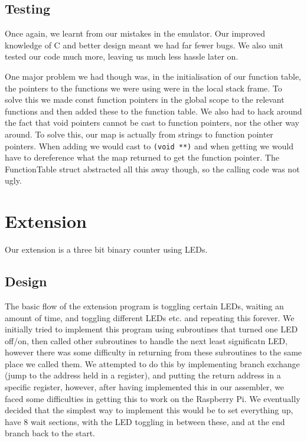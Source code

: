 \documentclass[a4paper]{article}
\begin{document}
\subsection{Testing}

Once again, we learnt from our mistakes in the emulator. Our improved knowledge of C and better design meant we had far fewer bugs. We also unit tested our code much more, leaving us much less hassle later on. 

One major problem we had though was, in the initialisation of our function table, the pointers to the functions we were using were in the local stack frame. To solve this we made const function pointers in the global scope to the relevant functions and then added these to the function table. We also had to hack around the fact that void pointers cannot be cast to function pointers, nor the other way around. To solve this, our map is actually from strings to function pointer pointers. When adding we would cast to \texttt{(void **)} and when getting we would have to dereference what the map returned to get the function pointer. The FunctionTable struct abstracted all this away though, so the calling code was not ugly.


\section{Extension}

Our extension is a three bit binary counter using LEDs.

\subsection{Design}
The basic flow of the extension program is toggling certain LEDs, waiting an amount of time, and toggling different LEDs etc. and repeating this forever.
We initially tried to implement this program using subroutines that turned one LED off/on, then called other subroutines to handle the next least significatn LED, however there was some difficulty in returning from these subroutines to the same place we called them.
We attempted to do this by implementing branch exchange (jump to the address held in a register), and putting the return address in a specific register, however, after having implemented this in our assembler, we faced some difficulties in getting this to work on the Raspberry Pi.
We eventually decided that the simplest way to implement this would be to set everything up, have 8 wait sections, with the LED toggling in between these, and at the end branch back to the start.
\end{document}
